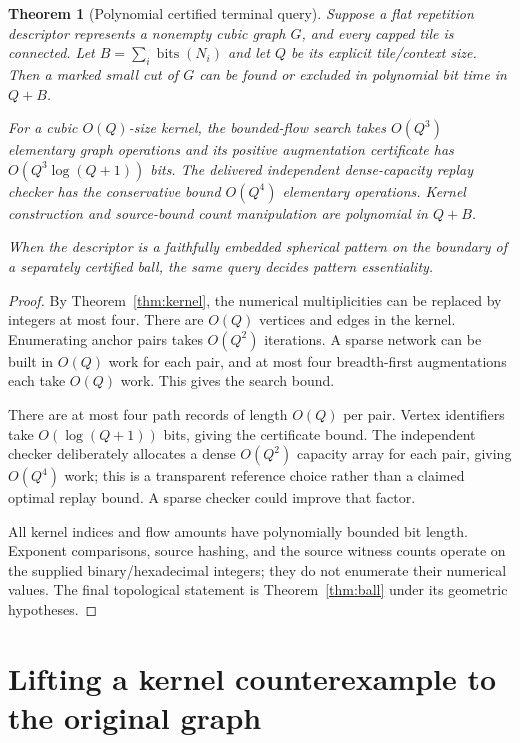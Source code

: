 \documentclass[11pt]{article}
\newtheorem{theorem}{Theorem}[section]
\theoremstyle{remark}\newtheorem{remark}[theorem]{Remark}
\newcommand{\bits}{\operatorname{bits}}
\begin{document}
\begin{theorem}[Polynomial certified terminal query]
\label{thm:complexity}
Suppose a flat repetition descriptor represents a nonempty cubic graph $G$, and every capped tile is connected. Let $B=\sum_i\bits(N_i)$ and let $Q$ be its explicit tile/context size. Then a marked small cut of $G$ can be found or excluded in polynomial bit time in $Q+B$.

For a cubic $O(Q)$-size kernel, the bounded-flow search takes $O(Q^3)$ elementary graph operations and its positive augmentation certificate has $O(Q^3\log(Q+1))$ bits. The delivered independent dense-capacity replay checker has the conservative bound $O(Q^4)$ elementary operations. Kernel construction and source-bound count manipulation are polynomial in $Q+B$.

When the descriptor is a faithfully embedded spherical pattern on the boundary of a separately certified ball, the same query decides pattern essentiality.
\end{theorem}
\begin{proof}
By Theorem~\ref{thm:kernel}, the numerical multiplicities can be replaced by integers at most four. There are $O(Q)$ vertices and edges in the kernel. Enumerating anchor pairs takes $O(Q^2)$ iterations. A sparse network can be built in $O(Q)$ work for each pair, and at most four breadth-first augmentations each take $O(Q)$ work. This gives the search bound.

There are at most four path records of length $O(Q)$ per pair. Vertex identifiers take $O(\log(Q+1))$ bits, giving the certificate bound. The independent checker deliberately allocates a dense $O(Q^2)$ capacity array for each pair, giving $O(Q^4)$ work; this is a transparent reference choice rather than a claimed optimal replay bound. A sparse checker could improve that factor.

All kernel indices and flow amounts have polynomially bounded bit length. Exponent comparisons, source hashing, and the source witness counts operate on the supplied binary/hexadecimal integers; they do not enumerate their numerical values. The final topological statement is Theorem~\ref{thm:ball} under its geometric hypotheses.
\end{proof}

\section{Lifting a kernel counterexample to the original graph}
\end{document}
